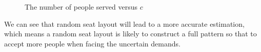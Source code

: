 \begin{figure}[ht]
  \centering
  \caption{The number of people served versus $c$}
\end{figure}

We can see that random seat layout will lead to a more accurate estimation, which means a random seat layout is likely to construct a full pattern so that to accept more people when facing the uncertain demands.

\newpage









